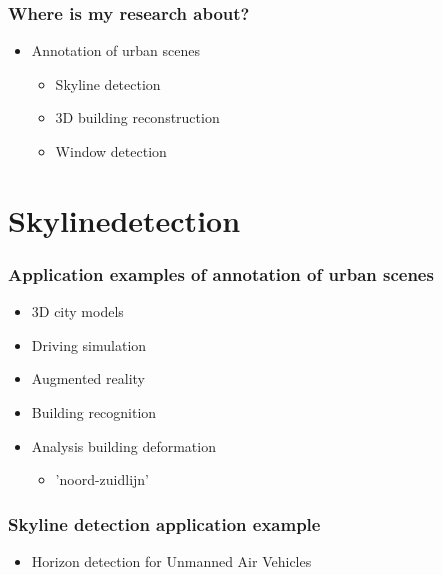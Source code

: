 \documentclass{beamer}
\begin{document}
\frame
{
	\frametitle{Where is my research about?}
	\begin{itemize}
	\item  <+-| alert@+>{Annotation of urban scenes}
		\begin{itemize}
			\item  <+-| alert@+> Skyline detection
			\item  <+-| alert@+> 3D building reconstruction
			\item  <+-| alert@+> Window detection
		\end{itemize}
	\end{itemize}

}

\section{Skylinedetection}
\frame
{
	\frametitle{Application examples of annotation of urban scenes}
	\begin{itemize}
		\item  <+-| alert@+> 3D city models
		\item  <+-| alert@+> Driving simulation
		\item  <+-| alert@+> Augmented reality
		\item  <+-| alert@+> Building recognition
		\item  <+-| alert@+> Analysis building deformation
		\begin{itemize}
			\item  <+-| alert@+> 	'noord-zuidlijn'
		\end{itemize}
	\end{itemize}
}


\frame
{
	\frametitle{Skyline detection application example}
	\begin{itemize}
		\item  <+-| alert@+> Horizon detection for Unmanned Air Vehicles
	\end{itemize}
}
\end{document}
